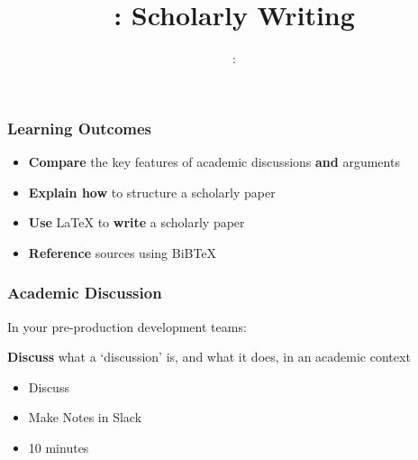 \usepackage{../../beamerthemeFalmouthGamesAcademy}
\usepackage{multimedia}
\graphicspath{ {../../} }


\usepackage[normalem]{ulem}
\usepackage{wasysym}

\usepackage{pdfpages}

\usetikzlibrary{arrows,automata}






\title{\sessionnumber: Scholarly Writing}
\subtitle{\modulecode: \moduletitle}

\frame{\titlepage} 

\begin{frame}
	\frametitle{Learning Outcomes}
	\begin{itemize}
		\item \textbf{Compare} the key features of academic discussions \textbf{and} arguments
		\item \textbf{Explain how} to structure a scholarly paper
		\item \textbf{Use} LaTeX to \textbf{write} a scholarly paper
		\item \textbf{Reference} sources using BiBTeX
	\end{itemize}
\end{frame}

\begin{frame}
	\frametitle{Academic Discussion}
	
	In your pre-production development teams:
	
	\vspace{2em}
	
	\textbf{Discuss} what a `discussion' is, and what it does, in an academic context 
	
	\begin{itemize}
		\item Discuss
		\item Make Notes in Slack
		\item 10 minutes
	\end{itemize}
\end{frame}

